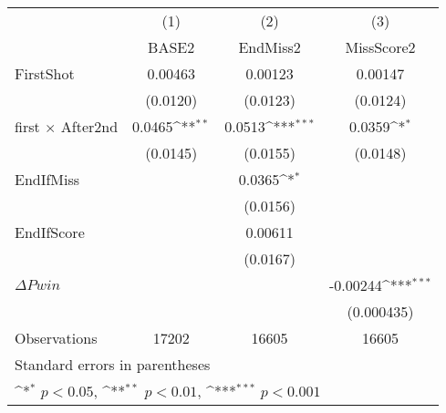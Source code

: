 {
\def\sym#1{\ifmmode^{#1}\else\(^{#1}\)\fi}
\begin{tabular}{l*{3}{c}}
\hline\hline
                    &\multicolumn{1}{c}{(1)}&\multicolumn{1}{c}{(2)}&\multicolumn{1}{c}{(3)}\\
                    &\multicolumn{1}{c}{BASE2}&\multicolumn{1}{c}{EndMiss2}&\multicolumn{1}{c}{MissScore2}\\
\hline
FirstShot           &     0.00463         &     0.00123         &     0.00147         \\
                    &    (0.0120)         &    (0.0123)         &    (0.0124)         \\
[1em]
first $\times$ After2nd&      0.0465\sym{**} &      0.0513\sym{***}&      0.0359\sym{*}  \\
                    &    (0.0145)         &    (0.0155)         &    (0.0148)         \\
[1em]
EndIfMiss           &                     &      0.0365\sym{*}  &                     \\
                    &                     &    (0.0156)         &                     \\
[1em]
EndIfScore          &                     &     0.00611         &                     \\
                    &                     &    (0.0167)         &                     \\
[1em]
$\Delta Pwin$       &                     &                     &    -0.00244\sym{***}\\
                    &                     &                     &  (0.000435)         \\
\hline
Observations        &       17202         &       16605         &       16605         \\
\hline\hline
\multicolumn{4}{l}{\footnotesize Standard errors in parentheses}\\
\multicolumn{4}{l}{\footnotesize \sym{*} \(p<0.05\), \sym{**} \(p<0.01\), \sym{***} \(p<0.001\)}\\
\end{tabular}
}
